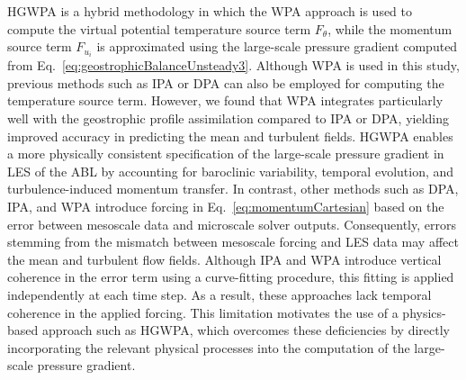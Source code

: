 HGWPA is a hybrid methodology in which the WPA approach is used to compute the virtual potential temperature source term \( F_\theta \), while the momentum source term \( F_{u_i} \) is approximated using the large-scale pressure gradient computed from Eq.~\ref{eq:geostrophicBalanceUnsteady3}. Although WPA is used in this study, previous methods such as IPA or DPA can also be employed for computing the temperature source term. However, we found that WPA integrates particularly well with the geostrophic profile assimilation compared to IPA or DPA, yielding improved accuracy in predicting the mean and turbulent fields. HGWPA enables a more physically consistent specification of the large-scale pressure gradient in LES of the ABL by accounting for baroclinic variability, temporal evolution, and turbulence-induced momentum transfer. In contrast, other methods such as DPA, IPA, and WPA introduce forcing in Eq.~\ref{eq:momentumCartesian} based on the error between mesoscale data and microscale solver outputs. Consequently, errors stemming from the mismatch between mesoscale forcing and LES data may affect the mean and turbulent flow fields. Although IPA and WPA introduce vertical coherence in the error term using a curve-fitting procedure, this fitting is applied independently at each time step. As a result, these approaches lack temporal coherence in the applied forcing. This limitation motivates the use of a physics-based approach such as HGWPA, which overcomes these deficiencies by directly incorporating the relevant physical processes into the computation of the large-scale pressure gradient.

